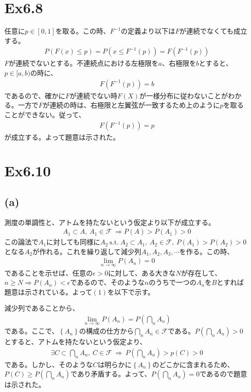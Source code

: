 \documentclass{article}
\begin{document}
\section{Ex6.8}
任意に$p \in [0,1]$を取る。この時、$F^{-1}$の定義より以下は$F$が連続でなくても成立する。
\begin{align*}
	P\left( F(x) \leq p \right) = P\left( x \leq F^{-1}(p) \right) = F \left(F^{-1} (p)\right)
\end{align*}
$F$が連続でないとする。不連続点における左極限を$a$、右極限を$b$とすると、$p\in [a, b)$の時に、
\begin{align*}
	F \left(F^{-1} (p)\right) = b
\end{align*}
であるので、確かに$F$が連続でない時$F(X)$が一様分布に従わないことがわかる。一方で$F$が連続の時は、右極限と左翼弦が一致するため上のように$p$を取ることができない。従って、
\begin{align*}
	F \left(F^{-1} (p)\right) = p
\end{align*}
が成立する。よって題意は示された。

\section{Ex6.10}
\subsection{(a)}
測度の単調性と、アトムを持たないという仮定より以下が成立する。
\begin{align*}
	A_1 \subset A,\ A_1 \in \mathcal{F}\ \Rightarrow P(A) > P(A_1) > 0
\end{align*}
この論法で$A_1$に対しても同様に$A_2\ \text{s.t.}\ A_2 \subset A_1,\ A_2 \in \mathcal{F},\ P(A_1) > P(A_2) > 0$となる$A_2$が作れる。これを繰り返して減少列$A_1, A_2, A_3, \cdots$を作る。この時、
\begin{align}
	\lim_{n \to \infty} P(A_n) = 0
\end{align}
であることを示せば、任意の$\epsilon > 0$に対して、ある大きな$N$が存在して、$n \geq N \Rightarrow P(A_n) < \epsilon$であるので、そのような$n$のうちで一つの$A_n$を$B$とすれば題意は示されている。よって$(1)$を以下で示す。

減少列であることから、
\begin{align*}
	\lim_{n \to \infty} P(A_n) = P(\bigcap_n A_n)
\end{align*}
である。ここで、$\left\{ A_n \right\}$の構成の仕方から$\bigcap_n A_n \in \mathcal{F}$である。$P\left( \bigcap_n A_n \right) > 0$とすると、アトムを持たないという仮定より、
\begin{align*}
	\exists C \subset \bigcap_n A_n,\ C \in \mathcal{F} \ \Rightarrow\ P\left( \bigcap_n A_n \right) > p(C) > 0
\end{align*}
である。しかし、そのような$C$は明らかに$\left\{ A_n \right\}$のどこかに含まれるため、$P(C)\geq P\left( \bigcap_n A_n \right)$であり矛盾する。よって、$P\left( \bigcap_n A_n \right) = 0$であるので題意は示された。
\end{document}
